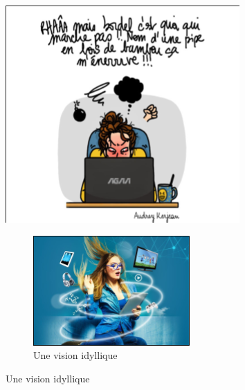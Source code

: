    \begin{figure}[!h]
    \begin{minipage}{0.6\linewidth}
        \centering
        \includegraphics[width=0.99\linewidth]{Figures/bot-real.png}
    \end{minipage}\hfill
    \begin{subfigure}{0.39\linewidth}
        \centering
        \includegraphics[width=0.975\linewidth]{Figures/bot-magic.png}
        \caption{\label{fig:bot-magic} Une vision idyllique}\vspace{0.15cm}\par%

\end{subfigure}
\end{figure}

